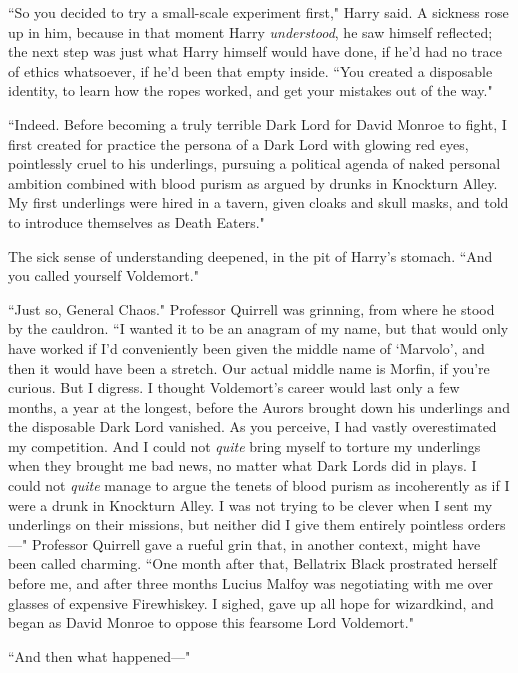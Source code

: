 ``So you decided to try a small-scale experiment first," Harry said. A sickness rose up in him, because in that moment Harry \emph{understood}, he saw himself reflected; the next step was just what Harry himself would have done, if he'd had no trace of ethics whatsoever, if he'd been that empty inside. ``You created a disposable identity, to learn how the ropes worked, and get your mistakes out of the way."

``Indeed. Before becoming a truly terrible Dark Lord for David Monroe to fight, I first created for practice the persona of a Dark Lord with glowing red eyes, pointlessly cruel to his underlings, pursuing a political agenda of naked personal ambition combined with blood purism as argued by drunks in Knockturn Alley. My first underlings were hired in a tavern, given cloaks and skull masks, and told to introduce themselves as Death Eaters."

The sick sense of understanding deepened, in the pit of Harry's stomach. ``And you called yourself Voldemort."

``Just so, General Chaos." Professor Quirrell was grinning, from where he stood by the cauldron. ``I wanted it to be an anagram of my name, but that would only have worked if I'd conveniently been given the middle name of `Marvolo', and then it would have been a stretch. Our actual middle name is Morfin, if you're curious. But I digress. I thought Voldemort's career would last only a few months, a year at the longest, before the Aurors brought down his underlings and the disposable Dark Lord vanished. As you perceive, I had vastly overestimated my competition. And I could not \emph{quite} bring myself to torture my underlings when they brought me bad news, no matter what Dark Lords did in plays. I could not \emph{quite} manage to argue the tenets of blood purism as incoherently as if I were a drunk in Knockturn Alley. I was not trying to be clever when I sent my underlings on their missions, but neither did I give them entirely pointless orders—" Professor Quirrell gave a rueful grin that, in another context, might have been called charming. ``One month after that, Bellatrix Black prostrated herself before me, and after three months Lucius Malfoy was negotiating with me over glasses of expensive Firewhiskey. I sighed, gave up all hope for wizardkind, and began as David Monroe to oppose this fearsome Lord Voldemort."

``And then what happened—"

